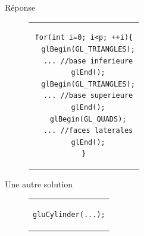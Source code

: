 \documentclass{beamer}
\begin{document}
\begin{frame}[fragile]
\begin{columns}[T]
\begin{column}{0.45\textwidth}
\begin{exampleblock}{Réponse}
\begin{figure}[h]
\begin{tabular}{c}
\begin{lstlisting}[basicstyle=\small]
for(int i=0; i<p; ++i){
  glBegin(GL_TRIANGLES);
  ... //base inferieure
  glEnd();
  glBegin(GL_TRIANGLES);
  ... //base superieure
  glEnd();
  glBegin(GL_QUADS);
  ... //faces laterales
  glEnd();
}
						\end{lstlisting}
					\end{tabular}
				\end{figure}
			\end{exampleblock}
			\pause
			\begin{exampleblock}{Une autre solution}
				\begin{figure}[h]
					\centering
					\begin{tabular}{c}
						\begin{lstlisting}[basicstyle=\small]
gluCylinder(...);
						\end{lstlisting}
					\end{tabular}
				\end{figure}
			\end{exampleblock}
		\end{column}
	\end{columns}
\end{frame}
\end{document}

